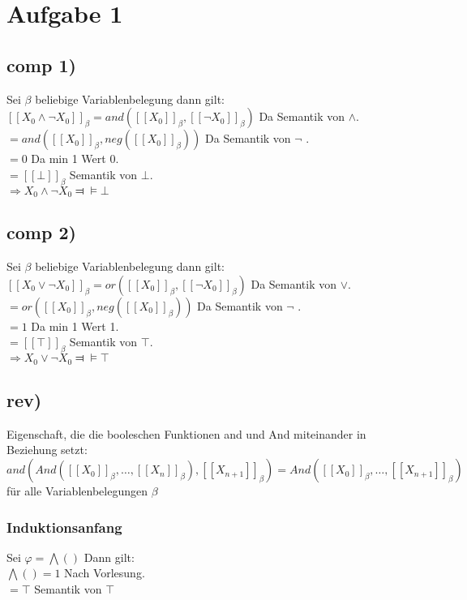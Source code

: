 \section*{Aufgabe 1}

\subsection*{comp 1)}

Sei $\beta$ beliebige Variablenbelegung dann gilt:\\

$[ [ X_0 \wedge \neg X_0 ] ]_\beta = and([[X_0 ]]_\beta , [[\neg X_0]]_\beta)$ Da Semantik von $\wedge$.\\
$=and([[X_0 ]]_\beta , neg([[ X_0]]_\beta))$ Da Semantik von $\neg$ .\\
$=0$ Da min 1 Wert 0. \\
$=[[\bot]]_\beta$ Semantik von $\bot$.\\
$\Rightarrow  X_0 \wedge \neg X_0 \Dashv \vDash \bot $

\subsection*{comp 2)}
Sei $\beta$ beliebige Variablenbelegung dann gilt:\\

$[ [ X_0 \vee \neg X_0 ] ]_\beta = or([[X_0 ]]_\beta , [[\neg X_0]]_\beta)$ Da Semantik von $\vee$.\\
$=or([[X_0 ]]_\beta , neg([[ X_0]]_\beta))$ Da Semantik von $\neg$ .\\
$=1$ Da min 1 Wert 1. \\
$=[[\top]]_\beta$ Semantik von $\top$.\\
$\Rightarrow  X_0 \vee \neg X_0 \Dashv \vDash \top $


\subsection*{rev)}
Eigenschaft, die die booleschen Funktionen and und And miteinander in Beziehung setzt:\\
$and(And([[X_0]]_\beta, \ldots , [[X_n]]_\beta), [[X_{n+1}]]_\beta)=And([[X_0]]_\beta , \ldots , [[X_{n+1}]]_\beta)$\\
für alle Variablenbelegungen $\beta$

\subsubsection*{Induktionsanfang}
Sei $\varphi = \bigwedge ()$ Dann gilt:\\
$\bigwedge () = 1 $ Nach Vorlesung.\\
$= \top$ Semantik von $\top$

